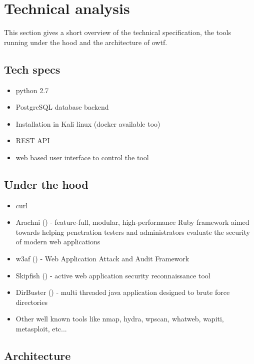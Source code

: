 \section{Technical analysis}

This section gives a short overview of the technical specification, the tools running under the hood and the architecture of \ac{owtf}.

\subsection{Tech specs}

\begin{itemize}
	\item python 2.7
	\item PostgreSQL database backend
	\item Installation in Kali linux (docker available too)
	\item REST API
	\item web based user interface to control the tool
\end{itemize}

\subsection{Under the hood}

\begin{itemize}
	\item curl
	\item Arachni (\cite{Arachni.11.06.2021}) - feature-full, modular, high-performance Ruby framework aimed towards helping penetration testers and administrators evaluate the security of modern web applications
	\item w3af (\cite{WAF.11.06.2021}) - Web Application Attack and Audit Framework
	\item Skipfish (\cite{Skipfish.11.06.2021}) - active web application security reconnaissance tool
	\item DirBuster (\cite{DirBuster.11.06.2021}) - multi threaded java application designed to brute force directories
	\item Other well known tools like nmap, hydra, wpscan, whatweb, wapiti, metasploit, etc...
\end{itemize}

\subsection{Architecture}

